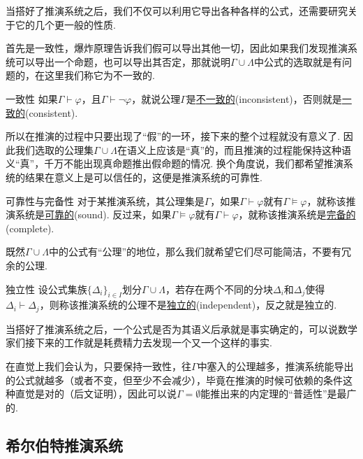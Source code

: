 当搭好了推演系统之后，我们不仅可以利用它导出各种各样的公式，还需要研究关于它的几个更一般的性质.

首先是一致性，爆炸原理告诉我们假可以导出其他一切，因此如果我们发现推演系统可以导出一个命题，也可以导出其否定，那就说明$\Gamma \cup \Lambda$中公式的选取就是有问题的，在这里我们称它为不一致的.
\begin{definition}{一致性}
    如果\(\Gamma \vdash \varphi\)，且\(\Gamma \vdash \neg \varphi\)，就说公理\(\Gamma\)是\underline{不一致的}(inconsistent)，否则就是\underline{一致的}(consistent). 
\end{definition}

所以在推演的过程中只要出现了“假”的一环，接下来的整个过程就没有意义了. 因此我们选取的公理集$\Gamma \cup \Lambda$在语义上应该是“真”的，而且推演的过程能保持这种语义“真”，千万不能出现真命题推出假命题的情况. 换个角度说，我们都希望推演系统的结果在意义上是可以信任的，这便是推演系统的可靠性.

\begin{definition}{可靠性与完备性}
    对于某推演系统，其公理集是\(\Gamma\)，如果\(\Gamma \vdash \varphi\)就有\(\Gamma \vDash \varphi\)，就称该推演系统是\underline{可靠的}(sound). \newline
    反过来，如果\(\Gamma \vDash \varphi\)就有\(\Gamma \vdash \varphi\)，就称该推演系统是\underline{完备的}(complete).
\end{definition}

既然$\Gamma \cup \Lambda $中的公式有“公理”的地位，那么我们就希望它们尽可能简洁，不要有冗余的公理.
\begin{definition}{独立性}
    设公式集族$\{\Delta_i\}_{i \in I}$划分$\Gamma \cup \Lambda$，若存在两个不同的分块$\Delta_i$和$\Delta_j$使得$\Delta_i \vdash \Delta_j$，则称该推演系统的公理不是\underline{独立的}(independent)，反之就是独立的.
\end{definition}

当搭好了推演系统之后，一个公式是否为其语义后承就是事实确定的，可以说数学家们接下来的工作就是耗费精力去发现一个又一个这样的事实.

在直觉上我们会认为，只要保持一致性，往\(\Gamma\)中塞入的公理越多，推演系统能导出的公式就越多（或者不变，但至少不会减少），毕竟在推演的时候可依赖的条件这种直觉是对的（后文证明），因此可以说\(\Gamma=\emptyset\)能推出来的内定理的“普适性”是最广的.

\subsection{希尔伯特推演系统}

